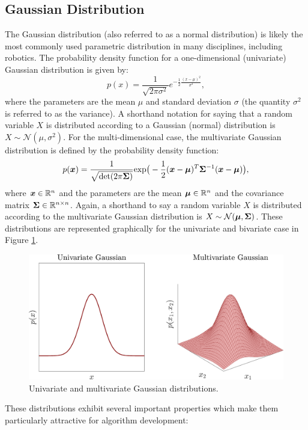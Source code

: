 \subsection{Gaussian Distribution}
The Gaussian distribution (also referred to as a normal distribution) is likely the most commonly used parametric distribution in many disciplines, including robotics. The probability density function for a one-dimensional (univariate) Gaussian distribution is given by:
\begin{equation}
p(x) = \frac{1}{\sqrt{2\pi \sigma^2}} e^{-\frac{1}{2}\frac{(x-\mu)^2}{\sigma^2}},
\end{equation}
where the parameters are the mean $\mu$ and standard deviation $\sigma$ (the quantity $\sigma^2$ is referred to as the variance). A shorthand notation for saying that a random variable $X$ is distributed according to a Gaussian (normal) distribution is $X \sim \mathcal{N}(\mu,\sigma^2)$.
For the multi-dimensional case, the multivariate Gaussian distribution is defined by the probability density function:
\begin{equation}
p(\bm{x}) = \frac{1}{\sqrt{\text{det}(2\pi \bm{\Sigma})}} \text{exp}\big( -\frac{1}{2}(\bm{x}-\bm{\mu})^T \bm{\Sigma}^{-1} (\bm{x}-\bm{\mu}) \big),
\end{equation}
where $\bm{x}\in \mathbb{R}^n$ and the parameters are the mean $\bm{\mu} \in \mathbb{R}^n$ and the covariance matrix $\bm{\Sigma} \in \mathbb{R}^{n \times n}$. Again, a shorthand to say a random variable $X$ is distributed according to the multivariate Gaussian distribution is $X \sim \mathcal{N}(\bm{\mu},\bm{\Sigma})$. These distributions are represented graphically for the univariate and bivariate case in Figure \ref{fig:Gaussians}.
\begin{figure}[ht]
\centering
\includegraphics[width=.85\textwidth]{tex/figs/ch15_figs/gaussians.png}
\caption{Univariate and multivariate Gaussian distributions.}
\label{fig:Gaussians}
\end{figure}
These distributions exhibit several important properties which make them particularly attractive for algorithm development:
